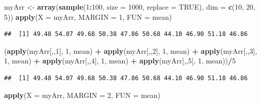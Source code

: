 \documentclass[]{book}
\newenvironment{Shaded}{\begin{snugshade}}{\end{snugshade}}
\newcommand{\DataTypeTok}[1]{\textcolor[rgb]{0.13,0.29,0.53}{#1}}
\newcommand{\DecValTok}[1]{\textcolor[rgb]{0.00,0.00,0.81}{#1}}
\newcommand{\KeywordTok}[1]{\textcolor[rgb]{0.13,0.29,0.53}{\textbf{#1}}}
\newcommand{\NormalTok}[1]{#1}
\newcommand{\OperatorTok}[1]{\textcolor[rgb]{0.81,0.36,0.00}{\textbf{#1}}}
\newcommand{\OtherTok}[1]{\textcolor[rgb]{0.56,0.35,0.01}{#1}}
\newcommand{\StringTok}[1]{\textcolor[rgb]{0.31,0.60,0.02}{#1}}
\begin{document}
\begin{Shaded}
\begin{Highlighting}[]
\NormalTok{myArr <-}\StringTok{ }\KeywordTok{array}\NormalTok{(}\KeywordTok{sample}\NormalTok{(}\DecValTok{1}\OperatorTok{:}\DecValTok{100}\NormalTok{, }\DataTypeTok{size =} \DecValTok{1000}\NormalTok{, }\DataTypeTok{replace =} \OtherTok{TRUE}\NormalTok{), }\DataTypeTok{dim =} \KeywordTok{c}\NormalTok{(}\DecValTok{10}\NormalTok{, }\DecValTok{20}\NormalTok{, }\DecValTok{5}\NormalTok{))}
\KeywordTok{apply}\NormalTok{(}\DataTypeTok{X =}\NormalTok{ myArr, }\DataTypeTok{MARGIN =} \DecValTok{1}\NormalTok{, }\DataTypeTok{FUN =}\NormalTok{ mean)}
\end{Highlighting}
\end{Shaded}

\begin{verbatim}
##  [1] 49.48 54.07 49.68 50.38 47.86 50.68 44.10 46.90 51.18 46.86
\end{verbatim}

\begin{Shaded}
\begin{Highlighting}[]
\NormalTok{(}\KeywordTok{apply}\NormalTok{(myArr[,,}\DecValTok{1}\NormalTok{], }\DecValTok{1}\NormalTok{, mean) }\OperatorTok{+}\StringTok{ }\KeywordTok{apply}\NormalTok{(myArr[,,}\DecValTok{2}\NormalTok{], }\DecValTok{1}\NormalTok{, mean) }\OperatorTok{+}\StringTok{ }
\StringTok{  }\KeywordTok{apply}\NormalTok{(myArr[,,}\DecValTok{3}\NormalTok{], }\DecValTok{1}\NormalTok{, mean) }\OperatorTok{+}\StringTok{ }\KeywordTok{apply}\NormalTok{(myArr[,,}\DecValTok{4}\NormalTok{], }\DecValTok{1}\NormalTok{, mean) }\OperatorTok{+}\StringTok{ }
\StringTok{  }\KeywordTok{apply}\NormalTok{(myArr[,,}\DecValTok{5}\NormalTok{], }\DecValTok{1}\NormalTok{, mean))}\OperatorTok{/}\DecValTok{5}
\end{Highlighting}
\end{Shaded}

\begin{verbatim}
##  [1] 49.48 54.07 49.68 50.38 47.86 50.68 44.10 46.90 51.18 46.86
\end{verbatim}

\begin{Shaded}
\begin{Highlighting}[]
\KeywordTok{apply}\NormalTok{(}\DataTypeTok{X =}\NormalTok{ myArr, }\DataTypeTok{MARGIN =} \DecValTok{2}\NormalTok{, }\DataTypeTok{FUN =}\NormalTok{ mean)}
\end{Highlighting}
\end{Shaded}
\end{document}
